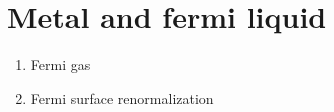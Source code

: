 \section{Metal and fermi liquid}

\begin{enumerate}
	\item Fermi gas
	\item Fermi surface renormalization
\end{enumerate}

